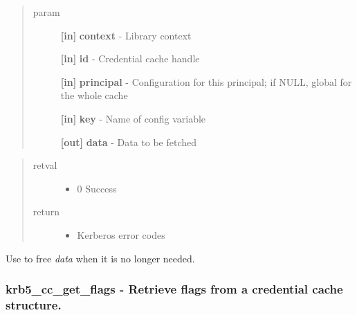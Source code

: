 \documentclass[letterpaper,10pt,english]{sphinxmanual}
\begin{document}
\begin{quote}\begin{description}
\item[{param}] \leavevmode
\textbf{{[}in{]}} \textbf{context} - Library context

\textbf{{[}in{]}} \textbf{id} - Credential cache handle

\textbf{{[}in{]}} \textbf{principal} - Configuration for this principal; if NULL, global for the whole cache

\textbf{{[}in{]}} \textbf{key} - Name of config variable

\textbf{{[}out{]}} \textbf{data} - Data to be fetched

\end{description}\end{quote}
\begin{quote}\begin{description}
\item[{retval}] \leavevmode\begin{itemize}
\item {} 
0   Success

\end{itemize}

\item[{return}] \leavevmode\begin{itemize}
\item {} 
Kerberos error codes

\end{itemize}

\end{description}\end{quote}

Use {\hyperref[appdev/refs/api/krb5_free_data_contents:krb5_free_data_contents]{}} to free \emph{data} when it is no longer needed.


\subsubsection{krb5\_cc\_get\_flags -  Retrieve flags from a credential cache structure.}
\label{appdev/refs/api/krb5_cc_get_flags:krb5-cc-get-flags-retrieve-flags-from-a-credential-cache-structure}\label{appdev/refs/api/krb5_cc_get_flags::doc}

\begin{fulllineitems}
\label{appdev/refs/api/krb5_cc_get_flags:krb5_cc_get_flags}
\end{fulllineitems}
\end{document}
